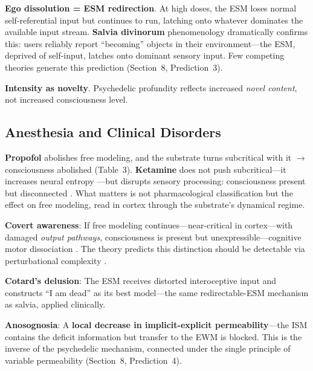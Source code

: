 \documentclass[12pt]{article}
\begin{document}
\textbf{Ego dissolution = ESM redirection}. At high doses, the ESM loses normal self-referential input but continues to run, latching onto whatever dominates the available input stream. \textbf{Salvia divinorum} phenomenology dramatically confirms this: users reliably report ``becoming'' objects in their environment---\hspace{0pt}the ESM, deprived of self-input, latches onto dominant sensory input. Few competing theories generate this prediction (Section~8, Prediction~3).

\textbf{Intensity as novelty}. Psychedelic profundity reflects increased \emph{novel content}, not increased consciousness level.


\subsection{Anesthesia and Clinical Disorders}

\textbf{Propofol} abolishes free modeling, and the substrate turns subcritical with it $\to$ consciousness abolished (Table~3). \textbf{Ketamine} does not push subcritical---\hspace{0pt}it increases neural entropy \citep{Schartner2017}---\hspace{0pt}but disrupts sensory processing: consciousness present but disconnected \citep{Corlett2011}. What matters is not pharmacological classification but the effect on free modeling, read in cortex through the substrate's dynamical regime.

\textbf{Covert awareness}: If free modeling continues---\hspace{0pt}near-critical in cortex---\hspace{0pt}with damaged \emph{output pathways}, consciousness is present but unexpressible---\hspace{0pt}cognitive motor dissociation \citep{Owen2006,Monti2010}. The theory predicts this distinction should be detectable via perturbational complexity \citep[PCI;][]{Casali2013,Casarotto2016}.

\textbf{Cotard's delusion}: The ESM receives distorted interoceptive input and constructs ``I am dead'' as its best model---\hspace{0pt}the same redirectable-ESM mechanism as salvia, applied clinically.

\textbf{Anosognosia}: A \textbf{local decrease in implicit-explicit permeability}---\hspace{0pt}the ISM contains the deficit information but transfer to the EWM is blocked. This is the inverse of the psychedelic mechanism, connected under the single principle of variable permeability (Section~8, Prediction~4).
\end{document}
